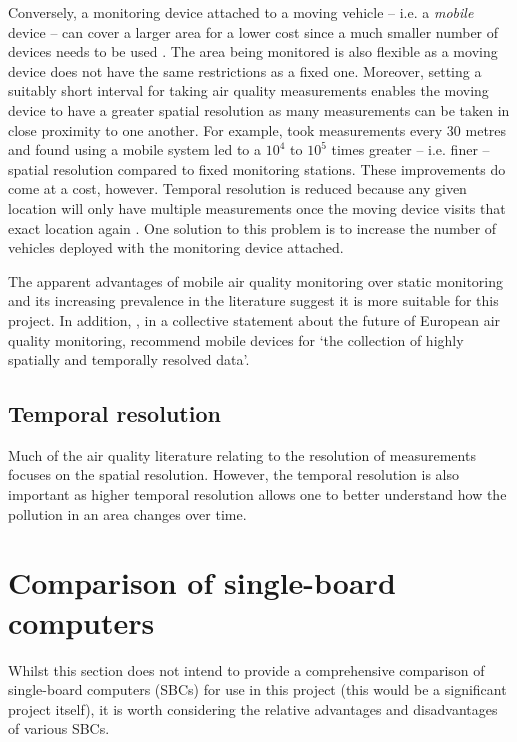 \documentclass[11pt]{report}
\begin{document}
Conversely, a monitoring device attached to a moving vehicle -- i.e. a \textit{mobile} device -- can cover a larger area for a lower cost since a much smaller number of devices needs to be used \citep{Wallace2009mobilehamilton}. The area being monitored is also flexible as a moving device does not have the same restrictions as a fixed one. Moreover, setting a suitably short interval for taking air quality measurements enables the moving device to have a greater spatial resolution as many measurements can be taken in close proximity to one another. For example, \cite{Apte2017googlestreetview} took measurements every 30 metres and found using a mobile system led to a $10^4$ to $10^5$ times greater -- i.e. finer -- spatial resolution compared to fixed monitoring stations. These improvements do come at a cost, however. Temporal resolution is reduced because any given location will only have multiple measurements once the moving device visits that exact location again \citep{Wong2009envmonitoringtemporal}. One solution to this problem is to increase the number of vehicles deployed with the monitoring device attached.

The apparent advantages of mobile air quality monitoring over static monitoring and its increasing prevalence in the literature suggest it is more suitable for this project. In addition, \cite{Kuhlbusch2014futureEUair}, in a collective statement about the future of European air quality monitoring, recommend mobile devices for `the collection of highly spatially and temporally resolved data'.

\subsection{Temporal resolution}

Much of the air quality literature relating to the resolution of measurements focuses on the spatial resolution. However, the temporal resolution is also important as higher temporal resolution allows one to better understand how the pollution in an area changes over time.


\section{Comparison of single-board computers}

Whilst this section does not intend to provide a comprehensive comparison of single-board computers (SBCs) for use in this project (this would be a significant project itself), it is worth considering the relative advantages and disadvantages of various SBCs.
\end{document}
